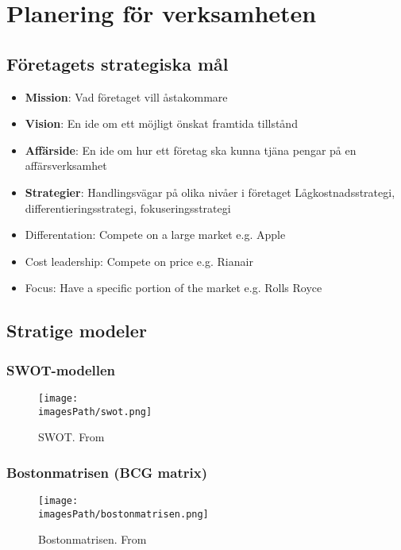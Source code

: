 \section{Planering för verksamheten}
\subsection{Företagets strategiska mål}
\begin{itemize}
    \item \textbf{Mission}: \newline
    Vad företaget vill åstakommare
    \item \textbf{Vision}: \newline
    En ide om ett möjligt önskat framtida tillstånd
    \item \textbf{Affärside}: \newline
    En ide om hur ett företag ska kunna tjäna pengar på en affärsverksamhet
    \item \textbf{Strategier}: \newline 
    Handlingsvägar på olika nivåer i företaget \newline
    Lågkostnadsstrategi, differentieringsstrategi, fokuseringsstrategi
\end{itemize}

\begin{itemize}
    \item Differentation: Compete on a large market e.g. Apple
    \item Cost leadership: Compete on price e.g. Rianair
    \item Focus: Have a specific portion of the market e.g. Rolls Royce
\end{itemize}

\newpage
\subsection{Stratige modeler}
\subsubsection{SWOT-modellen}
\begin{figure}[!ht]
    \centering
    \texttt{[image: \\imagesPath/swot.png]}
    \caption{SWOT. From \cite{}}
\end{figure}

\subsubsection{Bostonmatrisen (BCG matrix)}
\begin{figure}[!ht]
    \centering
    \texttt{[image: \\imagesPath/bostonmatrisen.png]}
    \caption{Bostonmatrisen. From \cite{}}
\end{figure}

